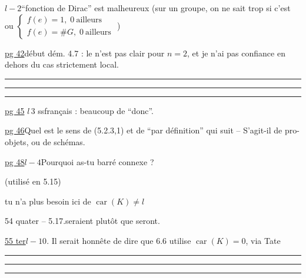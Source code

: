 
\quad $l-2$\qquad ``fonction de Dirac'' est malheureux (sur un groupe, on ne sait trop si c'est \quad ou $\left\{\begin{array}{l}f(e)=1,\;0\ \text{ailleurs}\\f(e)=\#G,\;0\ \text{ailleurs}\end{array}\right.$ )


\uline{pg 42}\quad début dém. 4.7 : le  n'est pas clair pour $n=2$, et je n'ai pas confiance en dehors du cas strictement local.

\hrule\smallskip\hrule\smallskip\hrule


\uline{pg 45} $l\,3$ ss\quad français : beaucoup de ``donc''.

\uline{pg 46}\quad Quel est le sens de (5.2.3,1) et de  ``par définition'' qui suit -- S'agit-il de pro-objets, ou de schémas.


\uline{pg 48}\quad $l-4$\quad Pourquoi as-tu barré connexe ?

\quad (utilisé en 5.15)

\quad tu n'a plus besoin ici de $\operatorname{car}(K)\ne l$

54 quater -- 5.17.\qquad seraient plutôt que seront.

\uline{55 ter}\quad $l-10$. Il serait honnête de dire que 6.6 utilise $\operatorname{car}(K)=0$, via Tate


\hrule\smallskip\hrule\smallskip\hrule

